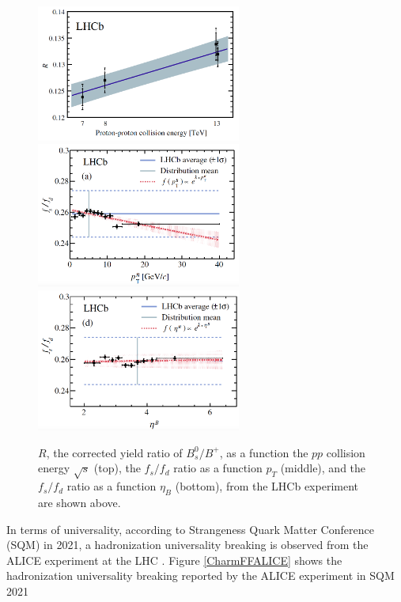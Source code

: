  \begin{figure}[hbtp]
\begin{center}
\includegraphics[width=0.60\textwidth]{Figures/Chapter1/LHCbFFs.png}
\includegraphics[width=0.60\textwidth]{Figures/Chapter1/LHCbFFpT.png}
\includegraphics[width=0.60\textwidth]{Figures/Chapter1/LHCbFFy.png}
\caption{ $R$, the corrected yield ratio of $B^0_s/B^+$, as a function the $pp$ collision energy $\sqrt s$ (top), the $f_s/f_d$ ratio as a function $p_T$ (middle), and the $f_s/f_d$ ratio as a function $\eta_B$ (bottom), from the LHCb experiment are shown above.}
\label{BeautyFFLHCb}
\end{center}
\end{figure}   


In terms of universality, according to Strangeness Quark Matter Conference (SQM) in 2021, a hadronization universality breaking is observed from the ALICE experiment at the LHC \cite{GMISQM}. Figure \ref{CharmFFALICE} shows the hadronization universality breaking reported by the ALICE experiment in SQM 2021


